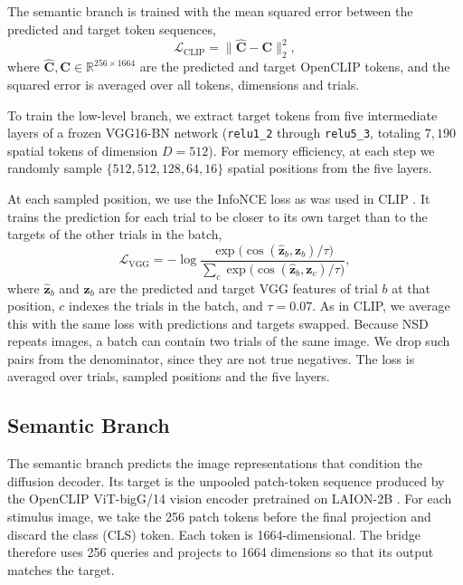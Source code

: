 \documentclass[conference]{IEEEtran}
\begin{document}
The semantic branch is trained with the mean squared error between the predicted and target token sequences,
\begin{equation}
\mathcal{L}_{\mathrm{CLIP}} = \big\lVert \hat{\mathbf{C}} - \mathbf{C} \big\rVert_2^2,
\end{equation}
where $\hat{\mathbf{C}}, \mathbf{C} \in \mathbb{R}^{256 \times 1664}$ are the predicted and target OpenCLIP tokens, and the squared error is averaged over all tokens, dimensions and trials.

To train the low-level branch, we extract target tokens from five intermediate layers of a frozen VGG16-BN network (\texttt{relu1\_2} through \texttt{relu5\_3}, totaling $7{,}190$ spatial tokens of dimension $D=512$). For memory efficiency, at each step we randomly sample $\{512, 512, 128, 64, 16\}$ spatial positions from the five layers.

At each sampled position, we use the InfoNCE loss \cite{oord2019representationlearningcontrastivepredictive} as was used in CLIP \cite{radford2021learningtransferablevisualmodels}. It trains the prediction for each trial to be closer to its own target than to the targets of the other trials in the batch,
\begin{equation}
\mathcal{L}_{\mathrm{VGG}} = -\log \frac{\exp\big(\cos(\hat{\mathbf{z}}_b, \mathbf{z}_b)/\tau\big)}{\sum_{c} \exp\big(\cos(\hat{\mathbf{z}}_b, \mathbf{z}_c)/\tau\big)},
\end{equation}
where $\hat{\mathbf{z}}_b$ and $\mathbf{z}_b$ are the predicted and target VGG features of trial $b$ at that position, $c$ indexes the trials in the batch, and $\tau = 0.07$. As in CLIP, we average this with the same loss with predictions and targets swapped. Because NSD repeats images, a batch can contain two trials of the same image. We drop such pairs from the denominator, since they are not true negatives. The loss is averaged over trials, sampled positions and the five layers.

\subsection{Semantic Branch}
\label{sec:semantic}
The semantic branch predicts the image representations that condition the diffusion decoder. Its target is the unpooled patch-token sequence produced by the OpenCLIP ViT-bigG/14 vision encoder pretrained on LAION-2B \cite{schuhmann2022laionb}. For each stimulus image, we take the 256 patch tokens before the final projection and discard the class (CLS) token. Each token is 1664-dimensional. The bridge therefore uses 256 queries and projects to 1664 dimensions so that its output matches the target.
\end{document}
